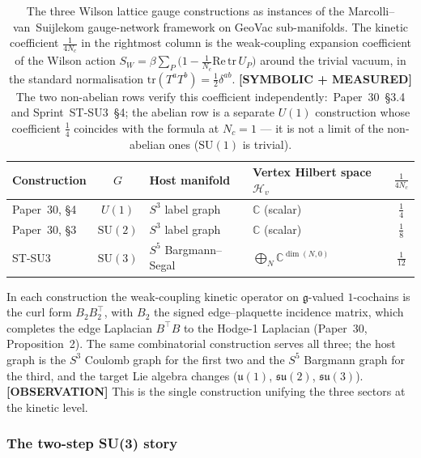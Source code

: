 \documentclass[11pt]{article}
\begin{document}
\begin{table}[h]
\centering
\small
\begin{tabular}{|l|c|l|l|c|}
\hline
\textbf{Construction} & $G$ & \textbf{Host manifold} &
\textbf{Vertex Hilbert space} $\mathcal{H}_v$ &
$\frac{1}{4 N_c}$ \\
\hline
Paper~30, \S 4 & $U(1)$ & $S^3$ label graph & $\mathbb{C}$ (scalar) &
$\frac{1}{4}$ \\
Paper~30, \S 3 & $\mathrm{SU}(2)$ & $S^3$ label graph &
$\mathbb{C}$ (scalar) & $\frac{1}{8}$ \\
ST-SU3 & $\mathrm{SU}(3)$ & $S^5$ Bargmann--Segal &
$\bigoplus_N \mathbb{C}^{\dim(N,0)}$ & $\frac{1}{12}$ \\
\hline
\end{tabular}
\caption{The three Wilson lattice gauge constructions as instances of
the Marcolli--van~Suijlekom gauge-network framework on GeoVac
sub-manifolds.  The kinetic coefficient
$\tfrac{1}{4 N_c}$ in the rightmost column is the weak-coupling
expansion coefficient of the Wilson action $S_W = \beta \sum_P \bigl(
1 - \tfrac{1}{N_c} \mathrm{Re}\,\mathrm{tr}\,U_P \bigr)$ around the
trivial vacuum, in the standard normalisation
$\mathrm{tr}(T^a T^b) = \tfrac{1}{2} \delta^{ab}$.  \textbf{[SYMBOLIC + MEASURED]} The two non-abelian rows
verify this coefficient independently:\ Paper~30~\S 3.4 and
Sprint~ST-SU3~\S 4; the abelian row is
a separate $U(1)$ construction whose coefficient $\tfrac14$ coincides
with the formula at $N_c = 1$ --- it is not a limit of the
non-abelian ones ($\mathrm{SU}(1)$ is trivial).}
\label{tab:unified_gauge}
\end{table}

In each construction the weak-coupling kinetic operator on
$\mathfrak{g}$-valued $1$-cochains is the curl form $B_2B_2^{\top}$,
with $B_2$ the signed edge--plaquette incidence matrix, which completes
the edge Laplacian $B^{\top}B$ to the Hodge-1 Laplacian
(Paper~30, Proposition~2).  The same
combinatorial construction serves all three; the host graph is the
$S^3$ Coulomb graph for the first two and the $S^5$ Bargmann graph for
the third, and the target Lie algebra changes ($\mathfrak{u}(1)$,
$\mathfrak{su}(2)$, $\mathfrak{su}(3)$).  \textbf{[OBSERVATION]} This is
the single construction unifying the three sectors at the kinetic level.

\subsubsection*{The two-step SU(3) story}
\end{document}

